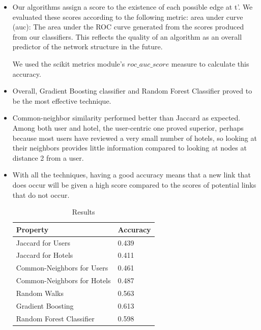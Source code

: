 \documentclass[letterpaper,twocolumn,11pt]{article}
\begin{document}
\begin{itemize}
\item Our algorithms assign a score to the existence of each possible edge at t'. We evaluated these scores according to the following metric: 
\subitem area under curve (auc): The area under the ROC curve generated from the scores produced from our classifiers. This reflects the quality of an algorithm as an overall predictor of the network structure in the future. 

\subitem We used the scikit metrics module's $roc\_auc\_score$ measure to calculate this accuracy. 

\item Overall, Gradient Boosting classifier and Random Forest Classifier proved to be the most effective technique.

\item Common-neighbor similarity performed better than Jaccard as expected. Among both user and hotel, the user-centric one proved superior, perhaps because most users have reviewed a very small number of hotels, so looking at their neighbors provides little information compared to looking at nodes at distance 2 from a user. 

\item With all the techniques, having a good accuracy means that a new link that does occur will be given a high score compared to the scores of potential links that do not occur. 

\begin{table}[ht]
	\begin{tabular}{ |p{5cm}|p{2cm} |}
		\hline
		\textbf {Property}  & \textbf{Accuracy}\\ \hline
			Jaccard for Users  & 0.439\\  \hline
			Jaccard for Hotels  & 0.411	\\  \hline
			Common-Neighbors for Users  & 0.461	 \\  \hline
            Common-Neighbors for Hotels  & 0.487	 \\  \hline
			Random Walks &	 0.563 \\  \hline
			Gradient Boosting&  0.613 \\  \hline
            Random Forest Classifier & 0.598	 \\  \hline

	\end{tabular}
	\caption{Results} 
	\label{tab:dist} 
\end{table} 

\end{itemize}
\end{document}
